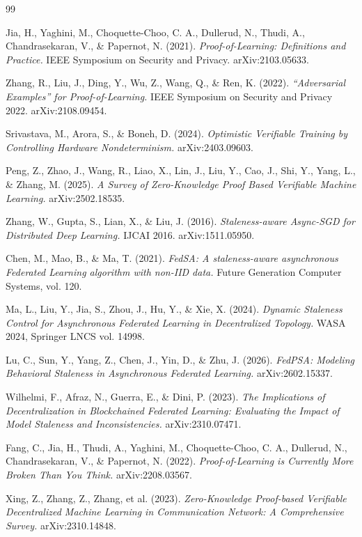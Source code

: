 \documentclass[11pt]{article}
\begin{document}
\begin{thebibliography}{99}

 Jia, H., Yaghini, M., Choquette-Choo, C. A., Dullerud, N., Thudi, A., Chandrasekaran, V., \& Papernot, N. (2021). \emph{Proof-of-Learning: Definitions and Practice.} IEEE Symposium on Security and Privacy. arXiv:2103.05633.

 Zhang, R., Liu, J., Ding, Y., Wu, Z., Wang, Q., \& Ren, K. (2022). \emph{``Adversarial Examples'' for Proof-of-Learning.} IEEE Symposium on Security and Privacy 2022. arXiv:2108.09454.

 Srivastava, M., Arora, S., \& Boneh, D. (2024). \emph{Optimistic Verifiable Training by Controlling Hardware Nondeterminism.} arXiv:2403.09603.

 Peng, Z., Zhao, J., Wang, R., Liao, X., Lin, J., Liu, Y., Cao, J., Shi, Y., Yang, L., \& Zhang, M. (2025). \emph{A Survey of Zero-Knowledge Proof Based Verifiable Machine Learning.} arXiv:2502.18535.

 Zhang, W., Gupta, S., Lian, X., \& Liu, J. (2016). \emph{Staleness-aware Async-SGD for Distributed Deep Learning.} IJCAI 2016. arXiv:1511.05950.

 Chen, M., Mao, B., \& Ma, T. (2021). \emph{FedSA: A staleness-aware asynchronous Federated Learning algorithm with non-IID data.} Future Generation Computer Systems, vol. 120.

 Ma, L., Liu, Y., Jia, S., Zhou, J., Hu, Y., \& Xie, X. (2024). \emph{Dynamic Staleness Control for Asynchronous Federated Learning in Decentralized Topology.} WASA 2024, Springer LNCS vol. 14998.

 Lu, C., Sun, Y., Yang, Z., Chen, J., Yin, D., \& Zhu, J. (2026). \emph{FedPSA: Modeling Behavioral Staleness in Asynchronous Federated Learning.} arXiv:2602.15337.

 Wilhelmi, F., Afraz, N., Guerra, E., \& Dini, P. (2023). \emph{The Implications of Decentralization in Blockchained Federated Learning: Evaluating the Impact of Model Staleness and Inconsistencies.} arXiv:2310.07471.

 Fang, C., Jia, H., Thudi, A., Yaghini, M., Choquette-Choo, C. A., Dullerud, N., Chandrasekaran, V., \& Papernot, N. (2022). \emph{Proof-of-Learning is Currently More Broken Than You Think.} arXiv:2208.03567.

 Xing, Z., Zhang, Z., Zhang, et al. (2023). \emph{Zero-Knowledge Proof-based Verifiable Decentralized Machine Learning in Communication Network: A Comprehensive Survey.} arXiv:2310.14848.


\end{thebibliography}
\end{document}
